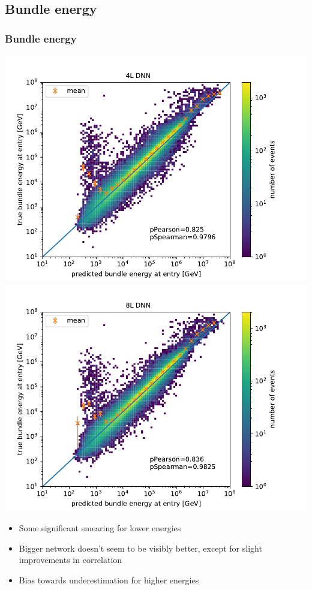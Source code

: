 \documentclass[aspectratio=1610, 9pt]{beamer}
\begin{document}
\subsection{Bundle energy}
\begin{frame}
  \frametitle{Bundle energy}
  \includegraphics[scale=0.45]{Plots/correlation_4L_bundle.pdf}
  \includegraphics[scale=0.45]{Plots/correlation_8L_bundle.pdf}
  \begin{itemize}
    \item Some significant smearing for lower energies
    \item Bigger network doesn't seem to be visibly better, except for slight improvements in correlation
    \item Bias towards underestimation for higher energies
  \end{itemize}
\end{frame}
\end{document}
